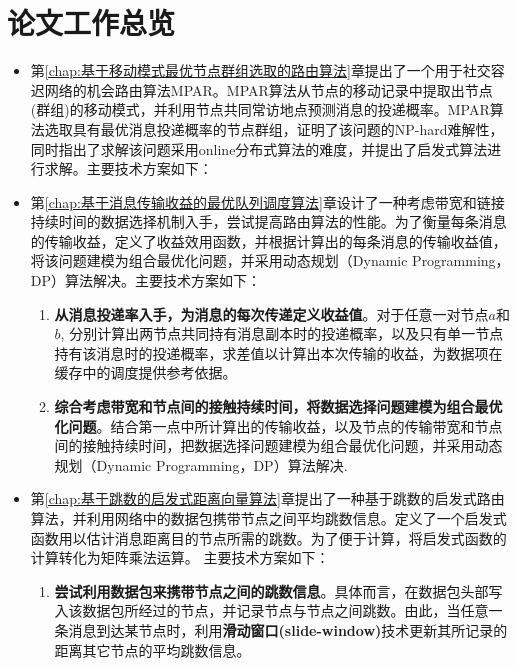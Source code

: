 \chapter{论文工作总览}


\begin{itemize}
\item 第\ref{chap:基于移动模式最优节点群组选取的路由算法}章提出了一个用于社交容迟网络的机会路由算法MPAR。MPAR算法从节点的移动记录中提取出节点(群组)的移动模式，并利用节点共同常访地点预测消息的投递概率。MPAR算法选取具有最优消息投递概率的节点群组，证明了该问题的NP-hard难解性，同时指出了求解该问题采用online分布式算法的难度，并提出了启发式算法进行求解。主要技术方案如下：
\begin{enumerate}

\end{enumerate}


\item 第\ref{chap:基于消息传输收益的最优队列调度算法}章设计了一种考虑带宽和链接持续时间的数据选择机制入手，尝试提高路由算法的性能。为了衡量每条消息的传输收益，定义了收益效用函数，并根据计算出的每条消息的传输收益值，将该问题建模为组合最优化问题，并采用动态规划（Dynamic Programming，DP）算法解决。主要技术方案如下：
\begin{enumerate}
\item \textbf{从消息投递率入手，为消息的每次传递定义收益值}。对于任意一对节点$a$和$b$, 分别计算出两节点共同持有消息副本时的投递概率，以及只有单一节点持有该消息时的投递概率，求差值以计算出本次传输的收益，为数据项在缓存中的调度提供参考依据。
\item \textbf{综合考虑带宽和节点间的接触持续时间，将数据选择问题建模为组合最优化问题}。结合第一点中所计算出的传输收益，以及节点的传输带宽和节点间的接触持续时间，把数据选择问题建模为组合最优化问题，并采用动态规划（Dynamic Programming，DP）算法解决.
\end{enumerate}

\item 第\ref{chap:基于跳数的启发式距离向量算法}章提出了一种基于跳数的启发式路由算法，并利用网络中的数据包携带节点之间平均跳数信息。定义了一个启发式函数用以估计消息距离目的节点所需的跳数。为了便于计算，将启发式函数的计算转化为矩阵乘法运算。
主要技术方案如下：
\begin{enumerate}
\item \textbf{尝试利用数据包来携带节点之间的跳数信息}。具体而言，在数据包头部写入该数据包所经过的节点，并记录节点与节点之间跳数。由此，当任意一条消息到达某节点时，利用\textbf{滑动窗口(slide-window)}技术更新其所记录的距离其它节点的平均跳数信息。


\end{enumerate}
\end{itemize}
